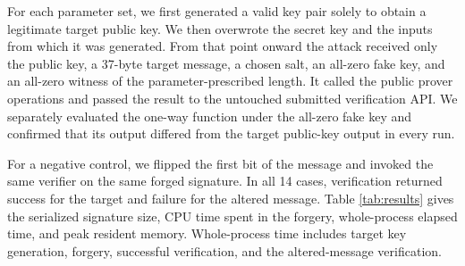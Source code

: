 \documentclass[11pt,a4paper]{article}
\begin{document}
For each parameter set, we first generated a valid key pair solely to obtain a
legitimate target public key.  We then overwrote the secret key and the inputs
from which it was generated.  From that point onward the attack received only
the public key, a 37-byte target message, a chosen salt, an all-zero fake key,
and an all-zero witness of the parameter-prescribed length.  It called the
public prover operations and passed the result to the untouched submitted
verification API.  We separately evaluated the one-way function under the
all-zero fake key and confirmed that its output differed from the target
public-key output in every run.

For a negative control, we flipped the first bit of the message and invoked
the same verifier on the same forged signature.  In all 14 cases, verification
returned success for the target and failure for the altered message.  Table
\ref{tab:results} gives the serialized signature size, CPU time spent in the
forgery, whole-process elapsed time, and peak resident memory.  Whole-process
time includes target key generation, forgery, successful verification, and
the altered-message verification.
\end{document}
